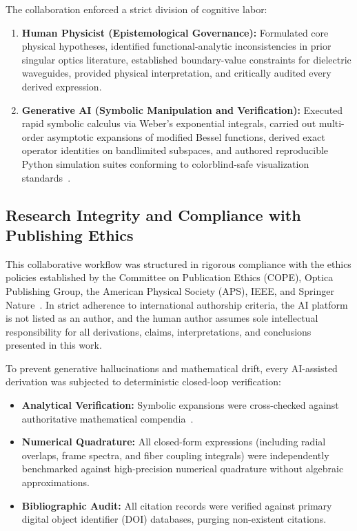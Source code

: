 \documentclass{optica-article}
\begin{document}
The collaboration enforced a strict division of cognitive labor:
\begin{enumerate}
    \item \textbf{Human Physicist (Epistemological Governance):} Formulated core physical hypotheses, identified functional-analytic inconsistencies in prior singular optics literature, established boundary-value constraints for dielectric waveguides, provided physical interpretation, and critically audited every derived expression.
    \item \textbf{Generative AI (Symbolic Manipulation and Verification):} Executed rapid symbolic calculus via Weber's exponential integrals, carried out multi-order asymptotic expansions of modified Bessel functions, derived exact operator identities on bandlimited subspaces, and authored reproducible Python simulation suites conforming to colorblind-safe visualization standards~\cite{Zhu2026PaperBanana}.
\end{enumerate}

\subsection{Research Integrity and Compliance with Publishing Ethics}
This collaborative workflow was structured in rigorous compliance with the ethics policies established by the Committee on Publication Ethics (COPE), Optica Publishing Group, the American Physical Society (APS), IEEE, and Springer Nature~\cite{Jauhiainen2026,Haber2025,OToole2024,Kacena2024}. In strict adherence to international authorship criteria, the AI platform is not listed as an author, and the human author assumes sole intellectual responsibility for all derivations, claims, interpretations, and conclusions presented in this work.

To prevent generative hallucinations and mathematical drift, every AI-assisted derivation was subjected to deterministic closed-loop verification:
\begin{itemize}
    \item \textbf{Analytical Verification:} Symbolic expansions were cross-checked against authoritative mathematical compendia~\cite{Gradshteyn2014,Arfken2012}.
    \item \textbf{Numerical Quadrature:} All closed-form expressions (including radial overlaps, frame spectra, and fiber coupling integrals) were independently benchmarked against high-precision numerical quadrature without algebraic approximations.
    \item \textbf{Bibliographic Audit:} All citation records were verified against primary digital object identifier (DOI) databases, purging non-existent citations.
\end{itemize}
\end{document}
